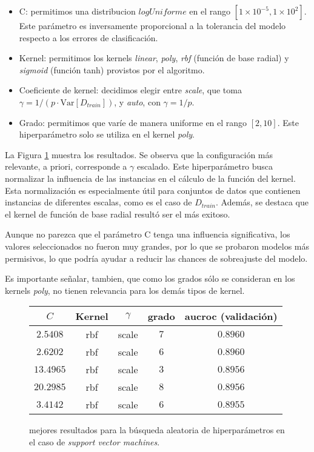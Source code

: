 \begin{itemize}
    \item C: permitimos una distribucion $\textit{logUniforme}$ en el rango $[1\times10^{-5}, 1\times10^{2}]$. Este parámetro es inversamente proporcional a la tolerancia del modelo respecto a los errores de clasificación.
    \item Kernel: permitimos los kernels \textit{linear}, \textit{poly}, \textit{rbf} (función de base radial) y \textit{sigmoid} (función tanh) provistos por el algoritmo.
    \item Coeficiente de kernel: decidimos elegir entre \textit{scale}, que toma $\gamma = 1/(p\cdot\text{Var}[D_{train}])$, y \textit{auto}, con $\gamma = 1/p$.
    \item Grado: permitimos que varíe de manera uniforme en el rango $[2, 10]$. Este hiperparámetro solo se utiliza en el kernel \textit{poly}.
\end{itemize}

La Figura \ref{support vector machines} muestra los resultados. Se observa que la configuración más relevante, a priori, corresponde a $\gamma$ escalado. Este hiperparámetro busca normalizar la influencia de las instancias en el cálculo de la función del kernel. Esta normalización es especialmente útil para conjuntos de datos que contienen instancias de diferentes escalas, como es el caso de $D_{train}$. Además, se destaca que el kernel de función de base radial resultó ser el más exitoso. 

Aunque no parezca que el parámetro C tenga una influencia significativa, los valores seleccionados no fueron muy grandes, por lo que se probaron modelos más permisivos, lo que podría ayudar a reducir las chances de sobreajuste del modelo. 

Es importante señalar, tambien, que como los grados sólo se consideran en los kernels \textit{poly}, no tienen relevancia para los demás tipos de kernel.

\vspace{0.5em}
\begin{figure}[!htbp]
    \begin{center}
        \begin{tabular}{ |c|c|c|c|c| } 
         \hline
        $C$ & Kernel & $\gamma$ & grado & aucroc (validación) \\
        \hline
        $2.5408$ & rbf     & scale & $7$ & $0.8960$ \\ 
        $2.6202$ & rbf    & scale & $6$ & $0.8960$ \\
        $13.4965$ & rbf   & scale & $3$ & $0.8956$ \\ 
        $20.2985$ & rbf   & scale & $8$ & $0.8956$ \\
        $3.4142$ & rbf    & scale & $6$ & $0.8955$ \\ 
        \hline
        \end{tabular}
    \end{center}
    \caption{mejores resultados para la búsqueda aleatoria de hiperparámetros en el caso de \textit{support vector machines}.} \label{support vector machines}
\end{figure}

